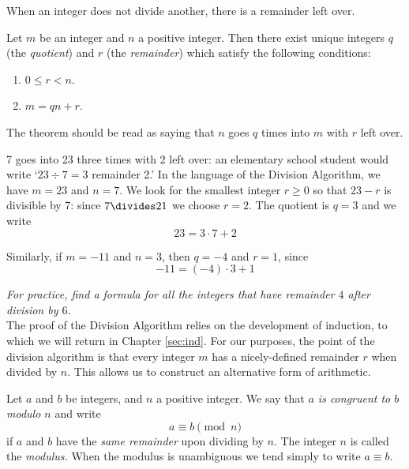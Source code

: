 When an integer does not divide another, there is a remainder left over.

\begin{thm}\label{thm:div}
Let $m$ be an integer and $n$ a positive integer. Then there exist unique integers $q$ (the \emph{quotient}) and $r$ (the \emph{remainder}) which satisfy the following conditions:
\begin{enumerate}\setlength{\itemsep}{0pt}
  \item $0\le r<n$.
  \item $m=qn+r$.
\end{enumerate} 
\end{thm}

\noindent The theorem should be read as saying that $n$ goes $q$ times into $m$ with $r$ left over. 

\begin{examples}
\item 7 goes into 23 three times with 2 left over: an elementary school student would write `$23\div 7=3$ remainder 2.' In the language of the Division Algorithm, we have $m=23$ and $n=7$. We look for the smallest integer $r\ge 0$ so that $23-r$ is divisible by 7: since $7\divides 21$ we choose $r=2$. The quotient is $q=3$ and we write
\[23=3\cdot 7+2\]
\item Similarly, if $m=-11$ and $n=3$, then $q=-4$ and $r=1$, since
\[-11=(-4)\cdot 3+1\] 
\end{examples}


\noindent\emph{For practice, find a formula for all the integers that have remainder $4$ after division by $6$.}\\


\noindent The proof of the Division Algorithm relies on the development of induction, to which we will return in Chapter \ref{sec:ind}. For our purposes, the point of the division algorithm is that every integer $m$ has a nicely-defined remainder $r$ when divided by $n$. This allows us to construct an alternative form of arithmetic.

\begin{defn}
Let $a$ and $b$ be integers, and $n$ a positive integer. We say that \emph{$a$ is congruent to $b$ modulo $n$} and write
\[a\equiv b\pmod n\]
if $a$ and $b$ have the \emph{same remainder} upon dividing by $n$. The integer $n$ is called the \emph{modulus.} When the modulus is unambiguous we tend simply to write $a\equiv b$.
\end{defn}

